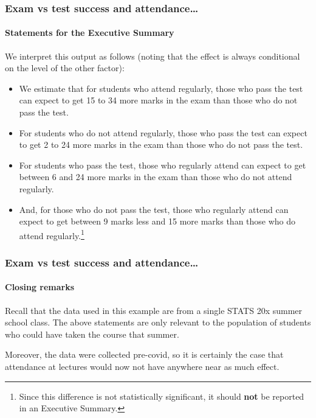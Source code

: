\documentclass{beamer}\usepackage[]{graphicx}\usepackage[]{xcolor}
\begin{document}
\begin{frame}[fragile]
\frametitle{Exam vs test success and attendance\ldots}
\framesubtitle{Statements for the Executive Summary}



We interpret this output as follows (noting that the effect is always conditional on the level of the other factor):

\begin{itemize}
  \item We estimate that for students who attend regularly, those who pass the test can
expect to get 15 to 34 more marks in the exam than those who do not pass the test.

  \item For students who do not attend regularly, those who pass the test can expect to get
2 to 24 more marks in the exam than those who do not pass the test.

  \item For students who pass the test, those who regularly attend can expect to get between 6 and 24 more marks in the exam than those who do not attend regularly.

\item And, for those who do not pass the test, those who regularly attend can expect to get between 9 marks less and 15 more marks than those who do attend regularly.\footnote{Since this difference is not statistically significant, it should {\bf not} be reported in an Executive Summary.}
\end{itemize}
\end{frame}



\begin{frame}[fragile]
\frametitle{Exam vs test success and attendance\ldots}
\framesubtitle{Closing remarks}
Recall that the data used in this example are from a single STATS 20x summer school class. 
The above statements are only relevant to the population of students who could have taken the course that summer.
\bigskip \bigskip

Moreover, the data were collected pre-covid, so it is certainly the case that attendance at lectures would now not have anywhere near as much effect. 
\end{frame}



\end{document}
